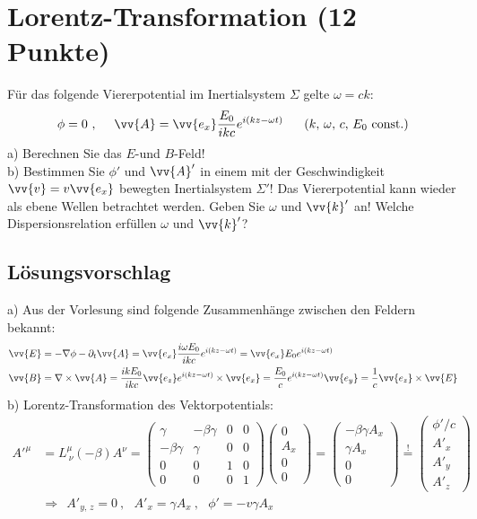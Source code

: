 \documentclass[a4paper,12pt]{article}
\begin{document}
\section{Lorentz-Transformation (12 Punkte)}
Für das folgende Viererpotential im Inertialsystem $\Sigma$ gelte $\omega =ck$:
$$\phi=0\ ,\ \ \ \ \vv{A}=\vv{e_x}\frac{E_0}{ikc}e^{i(kz-\omega t)}\ \ \ \ \ (k,\,\omega,\, c,\, E_0\ \textrm{const.})$$
a) Berechnen Sie das $E$-und $B$-Feld!\\
b) Bestimmen Sie $\phi'$ und $\vv{A}'$ in einem mit der Geschwindigkeit $\vv{v}=v\vv{e_x}$ bewegten Inertialsystem $\Sigma'$! Das Viererpotential kann wieder als ebene Wellen betrachtet werden. Geben Sie $\omega$ und $\vv{k}'$ an! Welche Dispersionsrelation erfüllen $\omega$ und $\vv{k}'$?
\subsection*{Lösungsvorschlag}
a) Aus der Vorlesung sind folgende Zusammenhänge zwischen den Feldern bekannt:
\begin{align*}
\vv{E}&=-\nabla\phi-\partial_t\vv{A}=\vv{e_x}\frac{i\omega E_0}{ikc}e^{i(kz-\omega t)}=\vv{e_x}E_0e^{i(kz-\omega t)}\\
\vv{B}&=\nabla\times\vv{A}=\frac{ikE_0}{ikc}\vv{e_z}e^{i(kz-\omega t)}\times\vv{e_x}=\frac{E_0}{c}e^{i(kz-\omega t)}\vv{e_y}=\frac{1}{c}\vv{e_z}\times\vv{E}
\end{align*}
b) Lorentz-Transformation des Vektorpotentials:
\begin{align*}
A'^\mu&=L^\mu_{\ \nu}(-\beta)A^\nu=\begin{pmatrix}
\gamma & -\beta\gamma &0&0\\
-\beta\gamma &\gamma &0&0\\
0&0&1&0\\
0&0&0&1
\end{pmatrix}\begin{pmatrix}
0\\ A_x\\0\\0
\end{pmatrix}=\begin{pmatrix}
-\beta\gamma A_x\\\gamma A_x\\0\\0
\end{pmatrix}\overset{!}{=}\begin{pmatrix}
\phi'/c\\A'_x\\A'_y\\A'_z
\end{pmatrix}\\
&\Rightarrow\ \ A'_{y,\, z}=0\ ,\ \ \ A'_x=\gamma A_x\ ,\ \ \ \phi'=-v\gamma A_x
\end{align*}
\end{document}
